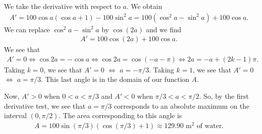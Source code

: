 	We take the derivative with respect to $a$. We obtain
		\begin{align*}
		A' = 100 \cos a (\cos a + 1) - 100 \sin^2 a = 100 (\cos^2 a - \sin^2 a) + 100 \cos a .
		\end{align*}
	We can replace $\cos^2 a - \sin^2 a$ by $\cos (2a)$ and we find
		\begin{align*}
		A' = 100 \cos (2a) + 100 \cos a .
		\end{align*}
	We see that 
		\begin{align*}
		A' = 0 \iff \cos 2a = -\cos a \iff \cos 2a = \cos (-a - \pi ) \iff 2a = -a + (2k-1) \pi.
		\end{align*}
	Taking $k = 0$, we see that $A' = 0$ $\iff$ $a = -\pi/3$. Taking $k= 1$, we see that $A'= 0$ $\iff$ $a = \pi/3$. This last angle is in the domain of our function $A$. 
	
	Now, $A' > 0$ when $0 < a < \pi/3$ and $A'< 0$ when $\pi/3 < a < \pi/2$. So, by the first derivative test, we see that $a = \pi/3$ corresponds to an absolute maximum on the interval $(0, \pi/2)$. The area corresponding to this angle is
		\begin{align*}
		A = 100 \sin (\pi/3) (\cos (\pi/3) + 1) \approx 129.90 \text{ m}^2 \text{ of water.}
		\end{align*}
	
	

